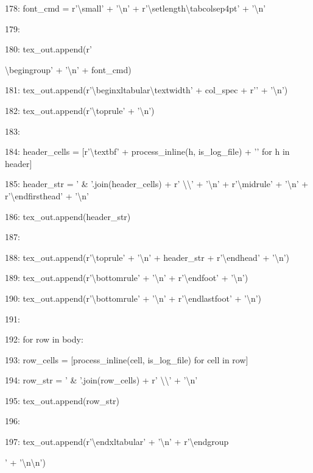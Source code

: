\documentclass[11pt,a4paper]{article}
\begin{document}
178:                     font\_cmd = r'\textbackslash{}small' + '\textbackslash{}n' + r'\textbackslash{}setlength{\textbackslash{}tabcolsep}{4pt}' + '\textbackslash{}n'

179:

180:                 tex\_out.append(r'{\textbackslash{}begingroup' + '\textbackslash{}n' + font\_cmd)

181:                 tex\_out.append(r'\textbackslash{}begin{xltabular}{\textbackslash{}textwidth}{' + col\_spec + r'}' + '\textbackslash{}n')

182:                 tex\_out.append(r'\textbackslash{}toprule' + '\textbackslash{}n')

183:

184:                 header\_cells = [r'\textbackslash{}textbf{' + process\_inline(h, is\_log\_file) + '}' for h in header]

185:                 header\_str = ' \& '.join(header\_cells) + r' \textbackslash{}\textbackslash{}' + '\textbackslash{}n' + r'\textbackslash{}midrule' + '\textbackslash{}n' + r'\textbackslash{}endfirsthead' + '\textbackslash{}n'

186:                 tex\_out.append(header\_str)

187:

188:                 tex\_out.append(r'\textbackslash{}toprule' + '\textbackslash{}n' + header\_str + r'\textbackslash{}endhead' + '\textbackslash{}n')

189:                 tex\_out.append(r'\textbackslash{}bottomrule' + '\textbackslash{}n' + r'\textbackslash{}endfoot' + '\textbackslash{}n')

190:                 tex\_out.append(r'\textbackslash{}bottomrule' + '\textbackslash{}n' + r'\textbackslash{}endlastfoot' + '\textbackslash{}n')

191:

192:                 for row in body:

193:                     row\_cells = [process\_inline(cell, is\_log\_file) for cell in row]

194:                     row\_str = ' \& '.join(row\_cells) + r' \textbackslash{}\textbackslash{}' + '\textbackslash{}n'

195:                     tex\_out.append(row\_str)

196:

197:                 tex\_out.append(r'\textbackslash{}end{xltabular}' + '\textbackslash{}n' + r'\textbackslash{}endgroup}' + '\textbackslash{}n\textbackslash{}n')
\end{document}
